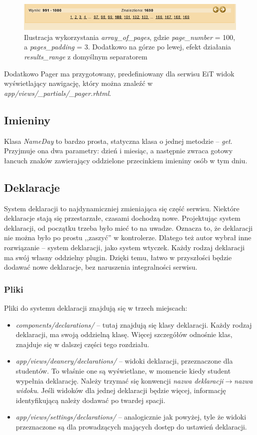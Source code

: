 \documentclass[a4paper,12pt,oneside]{report}
\begin{document}
\begin{figure}[h]
\centering
\includegraphics{array_of_pages.png}
\caption{Ilustracja wykorzystania \emph{array\_of\_pages}, gdzie \emph{page\_number} = 100, a \emph{pages\_padding} = 3\label{fing:array_of_pages}. Dodatkowo na górze po lewej, efekt działania \emph{results\_range} z domyślnym separatorem}
\end{figure}

Dodatkowo Pager ma przygotowany, predefiniowany dla serwisu EiT widok wyświetlający nawigację, który można znaleźć w \emph{app/views/\_partials/\_pager.rhtml}.

\subsection{Imieniny}
\label{sub:nameday}
Klasa \emph{NameDay} to bardzo prosta, statyczna klasa o jednej metodzie -- \emph{get}. Przyjmuje ona dwa parametry: dzień i miesiąc, a następnie zwraca gotowy łancuch znaków zawierający oddzielone przecinkiem imieniny osób w tym dniu.

\subsection{Deklaracje}
\label{sub:deklaracje}
System deklaracji to najdynamiczniej zmieniająca się część serwisu. Niektóre deklaracje stają się przestarzałe, czasami dochodzą nowe. Projektując system deklaracji, od początku trzeba było mieć to na uwadze. Oznacza to, że deklaracji nie można było po prostu ,,zaszyć'' w kontrolerze. Dlatego też autor wybrał inne rozwiązanie -- system deklaracji, jako system wtyczek. Każdy rodzaj deklaracji ma swój własny oddzielny plugin. Dzięki temu, łatwo w przyszłości będzie dodawać nowe deklaracje, bez naruszenia integralności serwisu. 

\subsubsection{Pliki}
\label{subsub:dec-files}
Pliki do systemu deklaracji znajdują się w trzech miejscach:
\begin{itemize}
  \item \emph{components/declarations/} -- tutaj znajdują się klasy deklaracji. Każdy rodzaj deklaracji, ma swoją oddzielną klasę. Więcej szczegółów odnośnie klas, znajduje się w dalszej części tego rozdziału.
  \item \emph{app/views/deanery/declarations/} -- widoki deklaracji, przeznaczone dla studentów. To właśnie one są wyświetlane, w momencie kiedy student wypełnia deklarację. Należy trzymać się konwencji \emph{nazwa deklaracji}$\to$\emph{nazwa widoku}. Jeśli widoków dla jednej deklaracji będzie więcej, informację identyfikującą należy dodawać po twardej spacji.
  \item \emph{app/views/settings/declarations/} -- analogicznie jak powyżej, tyle że widoki przeznaczone są dla prowadzących mających dostęp do ustawień deklaracji.
\end{itemize}
\end{document}
